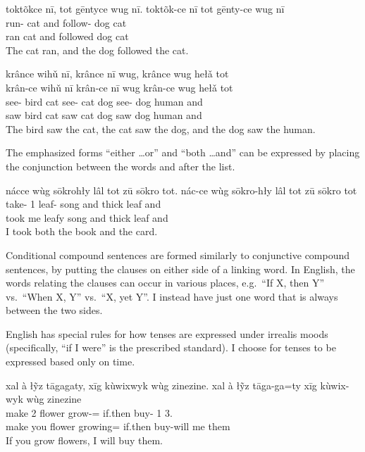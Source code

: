 \begin{exe}
    \ex
    \glt
    toktõkce nī, tot gēntyce wug nī.
    \glll
    toktõk-ce nī tot gēnty-ce wug nī \\
    run-\Pst{} cat and follow-\Pst{} dog cat \\
    ran cat and followed dog cat \\
    \glt
    The cat ran, and the dog followed the cat.
\end{exe}

\begin{exe}
    \ex
    \glt
    krânce wihǔ nī, krânce nī wug, krânce wug hełǎ tot \\
    \glll
    krân-ce wihǔ nī krân-ce nī wug krân-ce wug hełǎ tot \\
    see-\Pst{} bird cat see-\Pst{} cat dog see-\Pst{} dog human and \\
    saw bird cat saw cat dog saw dog human and \\
    \glt
    The bird saw the cat, the cat saw the dog, and the dog saw the human.
\end{exe}

The emphasized forms ``either \dots or''
and ``both \dots and''
can be expressed by placing the conjunction between the words and after the list.

\begin{exe}
    \ex
    \glt
    nácce wùg sōkrohły lâl tot zū sōkro tot.
    \glll
    nác-ce wùg sōkro-hły lâl tot zū sōkro tot \\
    take-\Pst{} 1\Sg{} leaf-\Adj{} song and thick leaf and \\
    took me leafy song and thick leaf and \\
    \glt
    I took both the book and the card.
\end{exe}

Conditional compound sentences are formed
similarly to conjunctive compound sentences,
by putting the clauses on either side of a linking word.
In English, the words relating the clauses can occur in various places,
e.g.\ ``If X, then Y'' vs.\ ``When X, Y'' vs.\ ``X, yet Y''.
I instead have just one word that is always between the two sides.

English has special rules for how tenses are expressed under irrealis moods
(specifically, ``if I were'' is the prescribed standard).
I choose for tenses to be expressed based only on time.

\begin{exe}
    \ex
    \glt
    xal à łỹz tāgagaty, xīg kùwixwyk wùg zinezine.
    \glll
    xal à łỹz tāga-ga=ty xīg kùwix-wyk wùg zinezine \\
    make 2\Sg{} flower grow-\Ger{}=\Poss{} if.then buy-\Fut{} 1\Sg{} 3\Pl{}.\Inanim{} \\
    make you flower growing=\Poss{} if.then buy-will me them \\
    \glt
    If you grow flowers, I will buy them.
\end{exe}

